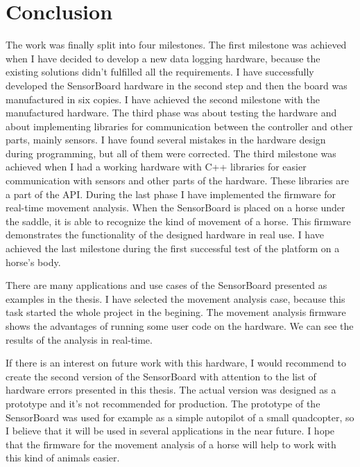 \chapter{Conclusion}
The work was finally split into four milestones. The first milestone was achieved when I have decided to develop a new data logging hardware, because the existing solutions didn't fulfilled all the requirements. I have successfully developed the SensorBoard hardware in the second step and then the board was manufactured in six copies. I have achieved the second milestone with the manufactured hardware. The third phase was about testing the hardware and about implementing libraries for communication between the controller and other parts, mainly sensors. I have found several mistakes in the hardware design during programming, but all of them were corrected. The third milestone was achieved when I had a working hardware with C++ libraries for easier communication with sensors and other parts of the hardware. These libraries are a part of the API. During the last phase I have implemented the firmware for real-time movement analysis. When the SensorBoard is placed on a horse under the saddle, it is able to recognize the kind of movement of a horse. This firmware demonstrates the functionality of the designed hardware in real use. I have achieved the last milestone during the first successful test of the platform on a horse's body.

There are many applications and use cases of the SensorBoard presented as examples in the thesis. I have selected the movement analysis case, because this task started the whole project in the begining. The movement analysis firmware shows the advantages of running some user code on the hardware. We can see the results of the analysis in real-time.

If there is an interest on future work with this hardware, I would recommend to create the second version of the SensorBoard with attention to the list of hardware errors presented in this thesis. The actual version was designed as a prototype and it's not recommended for production. The prototype of the SensorBoard was used for example as a simple autopilot of a small quadcopter, so I believe that it will be used in several applications in the near future. I hope that the firmware for the movement analysis of a horse will help to work with this kind of animals easier.
